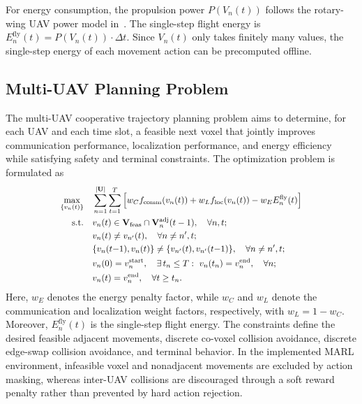 \documentclass[10pt,journal,letterpaper]{IEEEtran}
\begin{document}
For energy consumption, the propulsion power $P(V_n(t))$ follows the rotary-wing UAV power model in~\cite{ref17}. The single-step flight energy is $E_n^{\mathrm{fly}}(t)=P(V_n(t))\cdot\Delta t$. Since $V_n(t)$ only takes finitely many values, the single-step energy of each movement action can be precomputed offline.

\subsection{Multi-UAV Planning Problem}

The multi-UAV cooperative trajectory planning problem aims to determine, for each UAV and each time slot, a feasible next voxel that jointly improves communication performance, localization performance, and energy efficiency while satisfying safety and terminal constraints. The optimization problem is formulated as
\begin{equation}
\scalebox{0.90}{$\displaystyle
\begin{aligned}
\max_{\{v_n(t)\}}\quad
& \sum_{n=1}^{|\mathbf{U}|}\sum_{t=1}^{T}
\Big[
w_C f_{\mathrm{comm}}(v_n(t))
+ w_L f_{\mathrm{loc}}(v_n(t))
- w_E E_n^{\mathrm{fly}}(t)
\Big] \\
\mathrm{s.t.}\quad
& v_n(t)\in
\mathbf{V}_{\mathrm{feas}}\cap
\mathbf{V}_n^{\mathrm{adj}}(t-1),
\quad \forall n,t;\\
& v_n(t)\neq v_{n'}(t),
\quad \forall n\neq n',t;\\
& \{v_n(t{-}1),v_n(t)\}\neq
\{v_{n'}(t),v_{n'}(t{-}1)\},\quad \forall n\neq n',t;\\
& v_n(0)=v_n^{\mathrm{start}},\quad
\exists\,t_n\le T:\ v_n(t_n)=v_n^{\mathrm{end}},\quad \forall n;\\
& v_n(t)=v_n^{\mathrm{end}},\quad \forall t\ge t_n .
\end{aligned}
$}
\end{equation}
Here, $w_E$ denotes the energy penalty factor, while $w_C$ and $w_L$ denote the communication and localization weight factors, respectively, with $w_L=1-w_C$. Moreover, $E_n^{\mathrm{fly}}(t)$ is the single-step flight energy. The constraints define the desired feasible adjacent movements, discrete co-voxel collision avoidance, discrete edge-swap collision avoidance, and terminal behavior. In the implemented MARL environment, infeasible voxel and nonadjacent movements are excluded by action masking, whereas inter-UAV collisions are discouraged through a soft reward penalty rather than prevented by hard action rejection.
\end{document}
